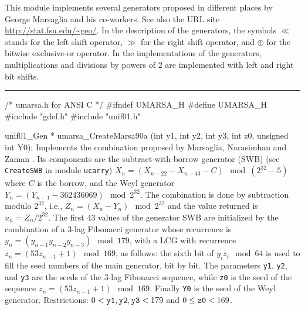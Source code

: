 
This module implements several generators proposed in different places
by George Marsaglia and his  co-workers.
See also the URL site \url{http://stat.fsu.edu/~geo/}.
In the description of the generators, the symbols $\ll$ stands for
 the left shift operator, $\gg$ for the right shift operator,
 and  $\oplus$ for the bitwise exclusive-or operator. In the
implementations of the generators, multiplications and divisions by powers
of 2 are implemented with left and right bit shifts.

\def\OP{\mathop {S}\nolimits}

\bigskip
\hrule
\code\hide
/* umarsa.h for ANSI C */
#ifndef UMARSA_H
#define UMARSA_H
\endhide
#include "gdef.h"
#include "unif01.h"


unif01_Gen * umarsa_CreateMarsa90a (int y1, int y2, int y3, int z0,
                                    unsigned int Y0);
\endcode
  \tab Implements the combination proposed by Marsaglia, Narasimhan and
   Zaman \cite{rMAR90a}. Its components are the subtract-with-borrow
%
   generator (SWB) (see {\tt CreateSWB} in module {\tt ucarry})
   $X_n = (X_{n-22} - X_{n-43} - C) \mod (2^{32}-5)$
   where $C$ is the borrow, and the Weyl generator
   $Y_n = (Y_{n-1} - 362436069) \mod 2^{32}$.
   The combination is done by subtraction modulo $2^{32}$, i.e.,
   $Z_n = (X_n - Y_n) \mod 2^{32}$ and the value returned is
   $u_n = Z_n/2^{32}$.
   The first 43 values of the generator SWB are initialized by the
   combination of a 3-lag Fibonacci generator whose recurrence is 
   $y_n = (y_{n-1}y_{n-2}y_{n-3}) \mod 179$, with a LCG with recurrence 
   $z_n = (53z_{n-1} + 1) \mod 169$, as
   follows: the sixth bit of $y_i z_i \mod 64$ is used to fill the seed
   numbers of the main generator, bit by bit.
   The parameters {\tt y1}, {\tt y2},  and {\tt y3} are the seeds of the
    3-lag Fibonacci sequence, while {\tt z0} is the seed of the
   sequence $z_{n} = (53 z_{n-1} + 1)\mod 169$.  Finally {\tt Y0}
   is the seed of the  Weyl generator.  Restrictions: $0 < {\tt y1}, 
   {\tt y2}, {\tt y3} < 179$ and $0 \le {\tt z0} < 169$.
  \endtab
\code


